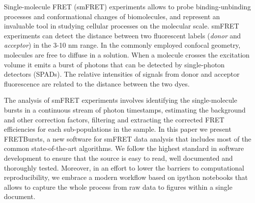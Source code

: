 Single-molecule FRET (smFRET) experiments allows to probe binding-unbinding processes and conformational changes of biomolecules, and represent an invaluable tool in studying cellular processes on the molecular scale\cite{Kapanidis_2006}. smFRET experiments can detect the distance between two fluorescent labels (\textit{donor} and \textit{acceptor}) in the 3-10 nm range. In the commonly employed confocal geometry, molecules are free to diffuse in a solution. When a molecule crosses the excitation volume it emits a burst of photons that can be detected by single-photon detectors (SPADs). 
The relative intensities of signals from donor and acceptor fluorescence are related to the distance between the two dyes.

The analysis of smFRET experiments involves identifying the single-molecule bursts in a continuous stream of photon timestamps, estimating the background and other correction factors, filtering and extracting the corrected FRET efficiencies for each sub-populations in the sample. In this paper we present FRETBursts, a new software for smFRET data analysis that includes most of the common state-of-the-art algorithms. We follow the highest standard in software development to ensure that the source is easy to read, well documented and thoroughly tested. Moreover, in an effort to lower the barriers to computational reproducibility, we embrace a modern workflow based on ipython notebooks that allows to capture the whole process from raw data to figures within a single document.
